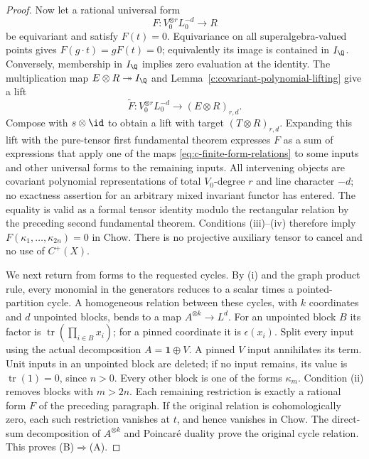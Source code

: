 \begin{proof}
Now let a rational universal form
\[
 F:V_0^{\otimes r}L_0^{-d}\longrightarrow R
\]
be equivariant and satisfy $F(t)=0$.  Equivariance on all
superalgebra-valued points gives $F(g\cdot t)=gF(t)=0$;
equivalently its image is contained in $I_\Q$.  Conversely,
membership in $I_\Q$ implies zero evaluation at the identity.
The multiplication map $E\otimes R\twoheadrightarrow I_\Q$
and Lemma~\ref{c:covariant-polynomial-lifting} give a lift
\[
 \widetilde F:V_0^{\otimes r}L_0^{-d}
                 \longrightarrow(E\otimes R)_{r,d}.
\]
Compose with $s\otimes\id$ to obtain a lift with target
$(T\otimes R)_{r,d}$.  Expanding this lift with the pure-tensor
first fundamental theorem expresses $F$ as a sum of expressions
that apply one of the maps \eqref{eq:c-finite-form-relations} to some inputs and other
universal forms to the remaining inputs.  All intervening
objects are covariant polynomial representations of total
$V_0$-degree $r$ and line character $-d$; no exactness assertion
for an arbitrary mixed invariant functor has entered.
The equality is valid as a formal tensor identity modulo the
rectangular relation by the preceding second fundamental
theorem.  Conditions (iii)--(iv) therefore imply
$F(\kappa_1,\ldots,\kappa_{2n})=0$ in Chow.  There is no
projective auxiliary tensor to cancel and no use of $C^+(X)$.

We next return from forms to the requested cycles.  By (i) and
the graph product rule, every monomial in the generators reduces
to a scalar times a pointed-partition cycle.  A homogeneous
relation between these cycles, with $k$ coordinates and $d$
unpointed blocks, bends to a map
$A^{\otimes k}\to L^d$.  For an unpointed block $B$ its factor
is $\operatorname{tr}(\prod_{i\in B}x_i)$; for a pinned
coordinate it is $\epsilon(x_i)$.  Split every input using the
actual decomposition $A=\mathbf1\oplus V$.  A pinned $V$ input
annihilates its term.  Unit inputs in an unpointed block are
deleted; if no input remains, its value is
$\operatorname{tr}(1)=0$, since $n>0$.  Every other block is one
of the forms $\kappa_m$.  Condition (ii) removes blocks with
$m>2n$.  Each remaining restriction is exactly a rational form
$F$ of the preceding paragraph.  If the original relation is
cohomologically zero, each such restriction vanishes at $t$,
and hence vanishes in Chow.  The direct-sum decomposition of
$A^{\otimes k}$ and Poincar\'e duality prove the original cycle
relation.  This proves (B)$\Rightarrow$(A).


\end{proof}
